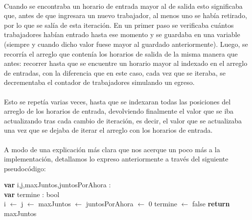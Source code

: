 \paragraph{}
Cuando se encontraba un horario de entrada mayor al de salida esto significaba que, antes de que ingresara un nuevo trabajador, al menos uno se hab\'ia retirado, por lo que se sal\'ia de esta iteraci\'on. En un primer paso se verificaba cu\'antos trabajadores habían entrado hasta ese momento y se guardaba en una variable (siempre y cuando dicho valor fuese mayor al guardado anteriormente). Luego, se recorr\'ia el arreglo que conten\'ia los horarios de salida de la misma manera que antes: recorrer hasta que se encuentre un horario mayor al indexado en el arreglo de entradas, con la diferencia que en este caso, cada vez que se iteraba, se decrementaba el contador de trabajadores simulando un egreso.

\paragraph{}
Esto se repet\'ia varias veces, hasta que se indexaran todas las posiciones del arreglo de los horarios de entrada, devolviendo finalmente el valor que se iba actualizando tras cada cambio de iteraci\'on, es decir, el valor que se actualizaba una vez que se dejaba de iterar el arreglo con los horarios de entrada.

\paragraph{}
A modo de una explicaci\'on m\'as clara que nos acerque un poco m\'as a la implementaci\'on, detallamos lo expreso anteriormente a trav\'es del siguiente pseudoc\'odigo:

\incmargin{1em}
\linesnumbered
{}


\begin{algorithm}[H]
\BlankLine
\textbf{var} i,j,maxJuntos,juntosPorAhora : \entero \\
\textbf{var} termine : bool \\
\BlankLine
i $\leftarrow$ j $\leftarrow$ maxJuntos $\leftarrow$ juntosPorAhora $\leftarrow$ 0
termine $\leftarrow$ false
\BlankLine
{}
\BlankLine
\textbf{return} maxJuntos
\end{algorithm}

